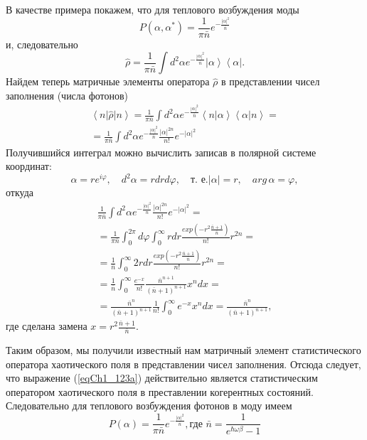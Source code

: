 В качестве примера покажем, что для теплового возбуждения моды 
\begin{equation}
P\left(\alpha, \alpha^{*}\right) = \frac{1}{\pi \bar{n}}
e^{- \frac{\left|\alpha\right|^2}{\bar{n}}}
\label{eqCh1_123a}
\end{equation}
и, следовательно
\[
\hat{\rho} = \frac{1}{\pi \bar{n}}
\int d^2 \alpha 
e^{- \frac{\left|\alpha\right|^2}{\bar{n}}}
\left|\alpha\right>
\left<\alpha\right|.
\]
Найдем теперь матричные элементы оператора $\hat{\rho}$ в
представлении чисел заполнения (числа фотонов)
\begin{eqnarray}
\left<n\right|
\hat{\rho}
\left|n\right> = 
\frac{1}{\pi \bar{n}}
\int d^2 \alpha 
e^{- \frac{\left|\alpha\right|^2}{\bar{n}}}
\left<n\right|\left.\alpha\right>
\left<\alpha\right|
\left.n\right> = 
\nonumber \\
= 
\frac{1}{\pi \bar{n}}
\int d^2 \alpha 
e^{- \frac{\left|\alpha\right|^2}{\bar{n}}}
\frac{\left|\alpha\right|^{2n}}{n!} 
e^{- \left|\alpha\right|^2} 
\nonumber 
\end{eqnarray}
Получившийся интеграл можно вычислить записав в полярной системе координат:
\[
\alpha = r e^{i \varphi}, \quad 
d^2 \alpha = r d r d \varphi , \quad 
\mbox{т. е.} 
\left|\alpha\right| = r, \quad arg\,\alpha = \varphi,
\]
откуда
\begin{eqnarray}
\frac{1}{\pi \bar{n}}
\int d^2 \alpha 
e^{- \frac{\left|\alpha\right|^2}{\bar{n}}}
\frac{\left|\alpha\right|^{2n}}{n!} 
e^{- \left|\alpha\right|^2} =
\nonumber \\
=
\frac{1}{\pi \bar{n}}
\int_0^{2 \pi} d \varphi 
\int_0^{\infty}
r dr \frac{exp \left(- r^2\frac{\bar{n} + 1}{\bar{n}}\right)}{n!} r^{2n}= 
\nonumber \\
= 
\frac{1}{\bar{n}}
\int_0^{\infty}
2 r dr \frac{exp \left(- r^2\frac{\bar{n} + 1}{\bar{n}}\right)}{n!}  r^{2n} = 
\nonumber \\
= 
\frac{1}{\bar{n}}
\int_0^{\infty}
\frac{e^{-x}}{n!}\frac{\bar{n}^{n + 1}}
{\left(\bar{n} + 1\right)^{n + 1}}x^n dx = 
\nonumber \\
=
\frac{\bar{n}^{n}}
{\left(\bar{n} + 1\right)^{n + 1}}
\frac{1}{n!}
\int_0^{\infty}
e^{-x}x^n dx = 
\frac{\bar{n}^{n}}
{\left(\bar{n} + 1\right)^{n + 1}},
\label{eqCh1_matrelemRho}
\end{eqnarray}
где сделана замена $x = r^2\frac{\bar{n} + 1}{\bar{n}}$.

Таким образом, мы получили известный нам матричный элемент
статистического оператора хаотического поля в представлении чисел
заполнения. Отсюда следует, что выражение (\ref{eqCh1_123a})
действительно является статистическим оператором хаотического поля в
преставлении когерентных состояний. Следовательно для теплового
возбуждения фотонов в моду имеем
\begin{equation}
P\left(\alpha\right) = \frac{1}{\pi \bar{n}}
e^{-\frac{\left|\alpha\right|^2}{\bar{n}}},
\mbox{где }
\bar{n} = \frac{1}{e^{\hbar \omega \beta} - 1}
\label{eqCh1_task4}
\end{equation}
  
